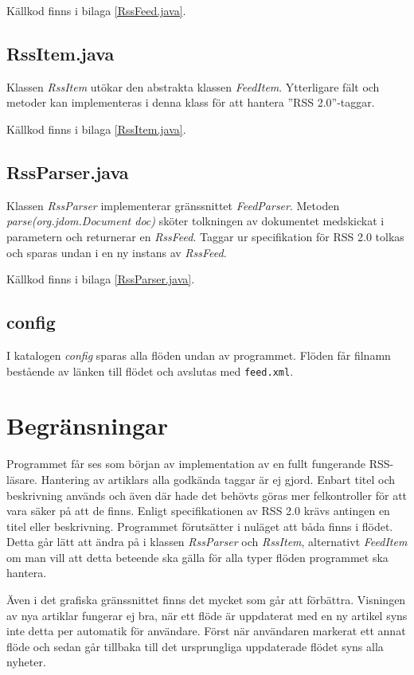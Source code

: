 \documentclass[titlepage, twoside, a4paper, 12pt]{article}
\begin{document}
Källkod finns i bilaga \ref{RssFeed.java}.
\subsection{RssItem.java}\label{RssItem}
Klassen \textit{RssItem} utökar den abstrakta klassen
\textit{FeedItem}. Ytterligare fält och metoder kan implementeras i
denna klass för att hantera ''RSS 2.0''-taggar.

Källkod finns i bilaga \ref{RssItem.java}.
\subsection{RssParser.java}\label{RssParser}
Klassen \textit{RssParser} implementerar gränssnittet
\textit{FeedParser}. Metoden \textit{parse(org.jdom.Document doc)}
sköter tolkningen av dokumentet medskickat i parametern och returnerar
en \textit{RssFeed}. Taggar ur specifikation för RSS 2.0 tolkas och
sparas undan i en ny instans av \textit{RssFeed}.

Källkod finns i bilaga \ref{RssParser.java}.
\subsection{config}
I katalogen \textit{config} sparas alla flöden undan av
programmet. Flöden får filnamn bestående av länken till flödet och
avslutas med \verb!feed.xml!.

\section{Begränsningar}\label{Begransningar}

Programmet får ses som början av implementation av en fullt fungerande
RSS-läsare. Hantering av artiklars alla godkända taggar är ej
gjord. Enbart titel och beskrivning används och även där hade det
behövts göras mer felkontroller för att vara säker på att de
finns. Enligt specifikationen av RSS 2.0 krävs antingen en titel eller
beskrivning. Programmet förutsätter i nuläget att båda finns i
flödet. Detta går lätt att ändra på i klassen \textit{RssParser} och
\textit{RssItem}, alternativt \textit{FeedItem} om man vill att detta
beteende ska gälla för alla typer flöden programmet ska hantera.

Även i det grafiska gränssnittet finns det mycket som går att
förbättra. Visningen av nya artiklar fungerar ej bra, när ett flöde är
uppdaterat med en ny artikel syns inte detta per automatik för
användare. Först när användaren markerat ett annat flöde och sedan går
tillbaka till det ursprungliga uppdaterade flödet syns alla nyheter.
\end{document}
